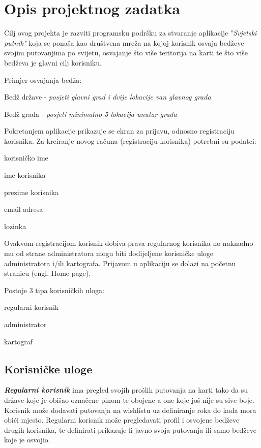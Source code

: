 \chapter{Opis projektnog zadatka}
		
		Cilj ovog projekta je razviti programsku podršku za stvaranje aplikacije "\textit{Svjetski putnik"} koja se ponaša kao društvena mreža na kojoj korisnik osvaja bedževe svojim putovanjima po svijetu, osvajanje što više teritorija na karti te što više bedževa je glavni cilj korisniku.
		
		Primjer osvajanja bedža:
		\begin{packed_item}
		    \item{Bedž države - \textit{posjeti glavni grad i dvije lokacije van glavnog grada}}
		    \item{Bedž grada - \textit{posjeti minimalno 5 lokacija unutar grada}}
		\end{packed_item}
		
		Pokretanjem aplikacije prikazuje se ekran za prijavu, odnosno registraciju korisnika. Za kreiranje novog računa (registraciju korisnika) potrebni su podatci:
		\begin{packed_item}
			\item{korisničko ime}
			\item{ime korisnika}
			\item{prezime korisnika}
			\item{email adresa}
			\item{lozinka}
		\end{packed_item}
		
		Ovakvom registracijom korisnik dobiva prava regularnog korisnika no naknadno mu od strane administratora mogu biti dodijeljene korisničke uloge administratora i/ili kartografa. Prijavom u aplikaciju se dolazi na početnu stranicu (engl. Home page).
		
		Postoje 3 tipa korisničkih uloga:
		\begin{packed_item}
			\item{regularni korisnik}
			\item{administrator}
			\item{kartograf}
		\end{packed_item}
		
		\section{Korisničke uloge}
		\textbf{\textit{Regularni korisnik}} ima pregled svojih prošlih putovanja na karti tako da su države koje je obišao označene pinom te obojene a one koje još nije su sive boje. Korisnik može dodavati putovanja na wishlistu uz definiranje roka do kada mora obići mjesto. Regularni korisnik može pregledavati profil i osvojene bedževe drugih korisnika, te definirati prikazuje li javno svoja putovanja ili samo bedževe koje je osvojio. 
		
